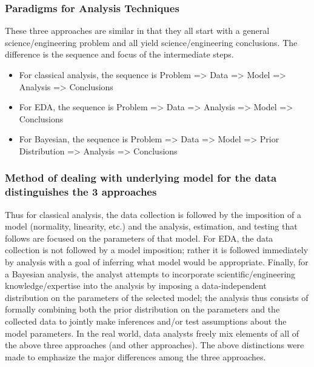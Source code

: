 \documentclass[]{book}
\providecommand{\tightlist}{%
  \setlength{\itemsep}{0pt}\setlength{\parskip}{0pt}}
\theoremstyle{definition}
\theoremstyle{definition}
\theoremstyle{definition}
\theoremstyle{remark}
\begin{document}
\subsubsection{Paradigms for Analysis
Techniques}\label{paradigms-for-analysis-techniques}

These three approaches are similar in that they all start with a general
science/engineering problem and all yield science/engineering
conclusions. The difference is the sequence and focus of the
intermediate steps.

\begin{itemize}
\tightlist
\item
  For classical analysis, the sequence is Problem =\textgreater{} Data
  =\textgreater{} Model =\textgreater{} Analysis =\textgreater{}
  Conclusions
\item
  For EDA, the sequence is Problem =\textgreater{} Data =\textgreater{}
  Analysis =\textgreater{} Model =\textgreater{} Conclusions
\item
  For Bayesian, the sequence is Problem =\textgreater{} Data
  =\textgreater{} Model =\textgreater{} Prior Distribution
  =\textgreater{} Analysis =\textgreater{} Conclusions
\end{itemize}

\subsubsection{Method of dealing with underlying model for the data
distinguishes the 3
approaches}\label{method-of-dealing-with-underlying-model-for-the-data-distinguishes-the-3-approaches}

Thus for classical analysis, the data collection is followed by the
imposition of a model (normality, linearity, etc.) and the analysis,
estimation, and testing that follows are focused on the parameters of
that model. For EDA, the data collection is not followed by a model
imposition; rather it is followed immediately by analysis with a goal of
inferring what model would be appropriate. Finally, for a Bayesian
analysis, the analyst attempts to incorporate scientific/engineering
knowledge/expertise into the analysis by imposing a data-independent
distribution on the parameters of the selected model; the analysis thus
consists of formally combining both the prior distribution on the
parameters and the collected data to jointly make inferences and/or test
assumptions about the model parameters. In the real world, data analysts
freely mix elements of all of the above three approaches (and other
approaches). The above distinctions were made to emphasize the major
differences among the three approaches.
\end{document}
